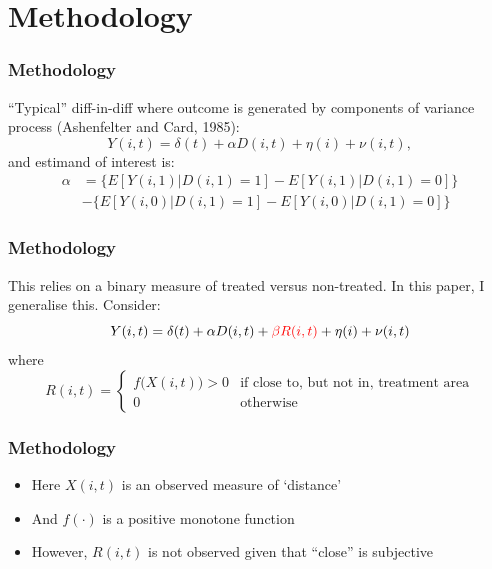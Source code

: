 \documentclass[10pt,letterpaper,subeqn]{beamer}
\begin{document}
\section{Methodology}
\begin{frame}[label=method1]
  \frametitle{Methodology}
``Typical'' diff-in-diff where outcome is generated by components of variance 
process (Ashenfelter and Card, 1985):
\vspace{4mm}
\begin{equation}
\label{Seqn:COV}
Y(i,t)=\delta(t) + \alpha D(i,t)+\eta(i)+\nu(i,t),
\end{equation}
\vspace{4mm}
and estimand of interest is:
\vspace{4mm}
\begin{eqnarray}
\label{Seqn:DD}
\alpha&=\{E[Y(i,1)|D(i,1)=1]-E[Y(i,1)|D(i,1)=0]\} \\ \nonumber
      &-\{E[Y(i,0)|D(i,1)=1]-E[Y(i,0)|D(i,1)=0]\}
\end{eqnarray}
\end{frame}

\begin{frame}[label=method2]
  \frametitle{Methodology}
This relies on a binary measure of treated versus non-treated.  In this paper,
I generalise this.  Consider:
\vspace{5mm}
\begin{equation}
\label{Seqn:COV2}
Y(i,t)=\delta(t) + \alpha D(i,t)+\textcolor{red}{\beta R(i,t)}+\eta(i)+\nu(i,t)
\end{equation}
\vspace{3mm}
where
\vspace{3mm}
\[
 R(i,t) =
  \begin{cases}
   f\Big(X(i,t)\Big)>0   & \text{if close to, but not in, treatment area} \\ 
   0                            & \text{otherwise} 
  \end{cases}
\]

\end{frame}

\begin{frame}[label=method3]
  \frametitle{Methodology}
\begin{itemize}
\item Here $X(i,t)$ is an observed measure of `distance'
\item And $f(\cdot)$ is a positive monotone function
\item However, $R(i,t)$ is not observed given that ``close'' is subjective
\end{itemize}
\end{frame}
\end{document}
